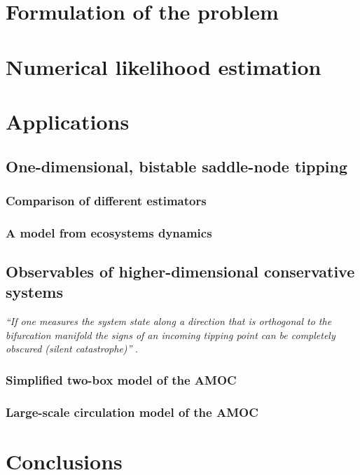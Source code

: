 \documentclass[openacc]{rsproca_new}
\begin{document}
\section{Formulation of the problem}\label{sec:setup}

\section{Numerical likelihood estimation}\label{sec:likelihood_estimation}

\section{Applications}\label{sec:applications}
\subsection{One-dimensional, bistable saddle-node tipping}
\subsubsection{Comparison of different estimators}
\subsubsection{A model from ecosystems dynamics}
\subsection{Observables of higher-dimensional conservative systems}
\textit{``If one measures the system state along a direction that is orthogonal to the bifurcation manifold the signs of an incoming tipping point can be completely obscured (silent catastrophe)''} \cite[p. 3]{Dylewsky2024}.
\subsubsection{Simplified two-box model of the AMOC}
\subsubsection{Large-scale circulation model of the AMOC}

\section{Conclusions}\label{sec:conclusions}

\end{document}
